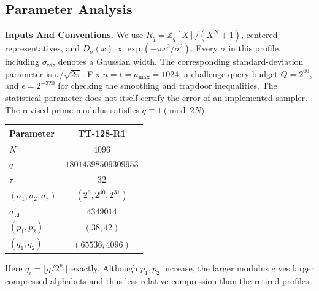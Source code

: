 \documentclass[lettersize,journal]{IEEEtran}
\newcommand{\parab}[1]{\noindent\textbf{#1} }
\begin{document}
	\subsection{Parameter Analysis}
	\label{app:tt128r1-parameters}
	\parab{Inputs And Conventions.}
	We use $R_q=\mathbb Z_q[X]/(X^N+1)$, centered representatives, and
	$D_\sigma(x)\propto\exp(-\pi x^2/\sigma^2)$.
	Every $\sigma$ in this profile, including
	$\sigma_{\mathsf{td}}$, denotes a Gaussian width. The corresponding
	standard-deviation parameter is $\sigma/\sqrt{2\pi}$.
	Fix
	$n=t=a_{\max}=1024$, a challenge-query budget $Q=2^{60}$, and
	$\epsilon=2^{-320}$ for checking the smoothing and trapdoor inequalities.
	The statistical parameter does not itself certify the error of an
	implemented sampler. The revised prime modulus satisfies
	$q\equiv1\pmod{2N}$.
	\begin{center}
		\small
		\begin{tabular}{lc}
			\hline
			Parameter & TT-128-R1\\
			\hline
			$N$ & $4096$\\
			$q$ & $18014398509309953$\\
			$\tau$ & $32$\\
			$(\sigma_1,\sigma_2,\sigma_r)$ & $(2^6,2^{40},2^{31})$\\
			$\sigma_{\mathsf{td}}$ & $4349014$\\
			$(p_1,p_2)$ & $(38,42)$\\
			$(q_1,q_2)$ & $(65536,4096)$\\
			\hline
		\end{tabular}
	\end{center}
	Here $q_i=\lfloor q/2^{p_i}\rceil$ exactly. Although $p_1,p_2$ increase,
	the larger modulus gives larger compressed alphabets and thus less
	relative compression than the retired profiles.
	
\end{document}
